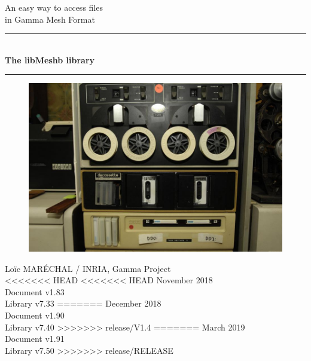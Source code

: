 \documentclass[a4paper,12pt]{article}
\newcommand{\HRule}{\rule{\linewidth}{1mm}}
\begin{document}
%
%

\begin{titlepage}

\begin{center}
\huge An easy way to access files\\ in Gamma Mesh Format
\HRule \\
\medskip
{\Huge \bfseries The libMeshb library} \\
\HRule
\end{center}

\vfill

\begin{figure}[htbp]
\begin{center}
\includegraphics[width=14cm]{tape.jpeg}
\end{center}
\end{figure}

\vfill

\begin{flushright}
\Large Lo\"ic MAR\'ECHAL / INRIA, Gamma Project\\
<<<<<<< HEAD
<<<<<<< HEAD
\Large November 2018 \\
\normalsize Document v1.83 \\
\normalsize Library v7.33
=======
\Large December 2018 \\
\normalsize Document v1.90 \\
\normalsize Library v7.40
>>>>>>> release/V1.4
=======
\Large March 2019 \\
\normalsize Document v1.91 \\
\normalsize Library v7.50
>>>>>>> release/RELEASE
\end{flushright}

\end{titlepage}
\end{document}
